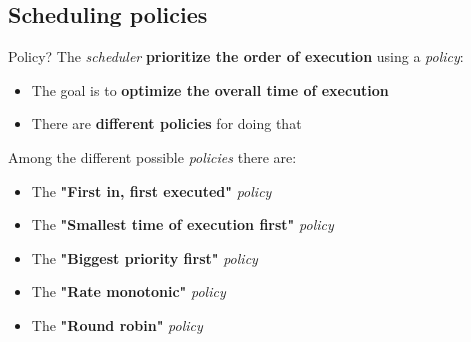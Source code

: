 \documentclass{beamer}[10pt, usepdftitle=false, handout]
\begin{document}
	\subsection{Scheduling policies}
	\begin{frame}
	
	\begin{block}{Policy?}
	The \textit{scheduler} \textbf{prioritize the order of execution} using a \textit{policy}:
	\begin{itemize}
	\item{The goal is to \textbf{optimize the overall time of execution}}
	\item{There are \textbf{different policies} for doing that}
	\end{itemize}		
	\end{block}	
		
	\vspace*{1em}
	Among the different possible \textit{policies} there are:
	\vspace*{1em} 
	\begin{itemize}
	\item{The \textbf{"First in, first executed"} \textit{policy}}
	\item{The \textbf{"Smallest time of execution first"} \textit{policy}}
	\item{The \textbf{"Biggest priority first"} \textit{policy}}
	\item{The \textbf{"Rate monotonic"} \textit{policy}}
	\item{The \textbf{"Round robin"} \textit{policy}}
	\end{itemize}
	
	\end{frame}
		
\end{document}
